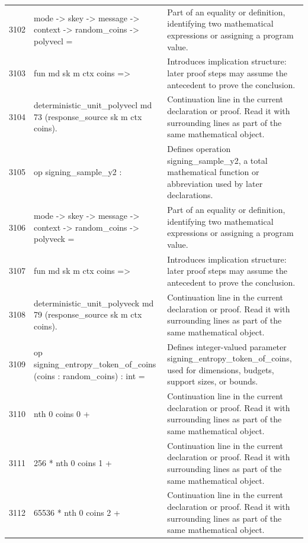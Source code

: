 \documentclass[10pt]{article}
\begin{document}
\begin{longtable}{r L{0.53\textwidth} L{0.37\textwidth}}
3102 & {\ttfamily\scriptsize   mode -> skey -> message -> context -> random\_coins -> polyvecl =} & Part of an equality or definition, identifying two mathematical expressions or assigning a program value. \\
3103 & {\ttfamily\scriptsize   fun md sk m ctx coins =>} & Introduces implication structure: later proof steps may assume the antecedent to prove the conclusion. \\
3104 & {\ttfamily\scriptsize     deterministic\_unit\_polyvecl md 73 (response\_source sk m ctx coins).} & Continuation line in the current declaration or proof.  Read it with surrounding lines as part of the same mathematical object. \\
3105 & {\ttfamily\scriptsize op signing\_sample\_y2 :} & Defines operation signing\_sample\_y2, a total mathematical function or abbreviation used by later declarations. \\
3106 & {\ttfamily\scriptsize   mode -> skey -> message -> context -> random\_coins -> polyveck =} & Part of an equality or definition, identifying two mathematical expressions or assigning a program value. \\
3107 & {\ttfamily\scriptsize   fun md sk m ctx coins =>} & Introduces implication structure: later proof steps may assume the antecedent to prove the conclusion. \\
3108 & {\ttfamily\scriptsize     deterministic\_unit\_polyveck md 79 (response\_source sk m ctx coins).} & Continuation line in the current declaration or proof.  Read it with surrounding lines as part of the same mathematical object. \\
3109 & {\ttfamily\scriptsize op signing\_entropy\_token\_of\_coins (coins : random\_coins) : int =} & Defines integer-valued parameter signing\_entropy\_token\_of\_coins, used for dimensions, budgets, support sizes, or bounds. \\
3110 & {\ttfamily\scriptsize   nth 0 coins 0 +} & Continuation line in the current declaration or proof.  Read it with surrounding lines as part of the same mathematical object. \\
3111 & {\ttfamily\scriptsize   256 * nth 0 coins 1 +} & Continuation line in the current declaration or proof.  Read it with surrounding lines as part of the same mathematical object. \\
3112 & {\ttfamily\scriptsize   65536 * nth 0 coins 2 +} & Continuation line in the current declaration or proof.  Read it with surrounding lines as part of the same mathematical object. \\

\end{longtable}
\end{document}

